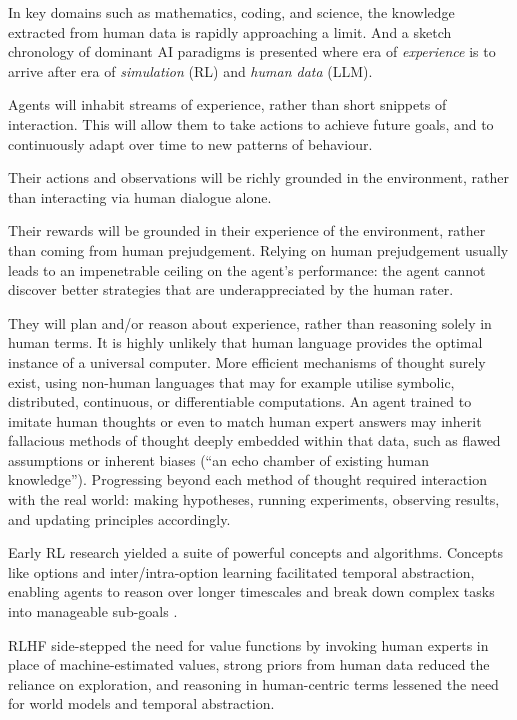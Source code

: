 
In key domains such as mathematics, coding, and science, the knowledge extracted from human data is rapidly approaching a limit.
And a sketch chronology of dominant AI paradigms is presented where era of \textit{experience} is to arrive after era of \textit{simulation} (RL) and \textit{human data} (LLM).


Agents will inhabit streams of experience, rather than short snippets of interaction. This will allow them to take actions to achieve future goals, and to continuously adapt over time to new patterns of behaviour.

Their actions and observations will be richly grounded in the environment, rather than interacting via human dialogue alone.

Their rewards will be grounded in their experience of the environment, rather than coming from human prejudgement. Relying on human prejudgement usually leads to an impenetrable ceiling on the agent’s performance: the agent cannot discover better strategies that are underappreciated by the human rater.

They will plan and/or reason about experience, rather than reasoning solely in human terms. It is highly unlikely that human language provides the optimal instance of a universal computer. More efficient mechanisms of thought surely exist, using non-human languages that may for example utilise symbolic, distributed, continuous, or differentiable computations. An agent trained to imitate human thoughts or even to match human expert answers may inherit fallacious methods of thought deeply embedded within that data, such as flawed assumptions or inherent biases (``an echo chamber of existing human knowledge''). Progressing beyond each method of thought required interaction with the real world: making hypotheses, running experiments, observing results, and updating principles accordingly.


Early RL research yielded a suite of powerful concepts and algorithms. Concepts like options and inter/intra-option learning facilitated temporal abstraction, enabling agents to reason over longer timescales and break down complex tasks into manageable sub-goals \parencite{sutton1999between}.

RLHF side-stepped the need for value functions by invoking human experts in place of machine-estimated values, strong priors from human data reduced the reliance on exploration, and reasoning in human-centric terms lessened the need for world models and temporal abstraction.

